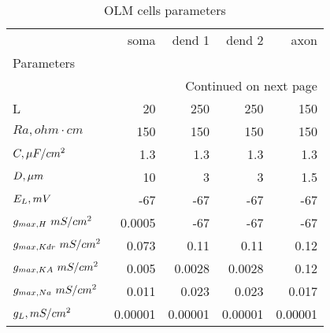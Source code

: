 \begin{longtable}{lrrrr}
\caption{OLM cells parameters}\label{ca1__cell_parameters}\\
\toprule
{} &    soma &  dend 1 &  dend 2 &    axon \\
Parameters      &         &         &         &         \\
\midrule
\endhead
\midrule
\multicolumn{5}{r}{{Continued on next page}} \\
\midrule
\endfoot

\bottomrule
\endlastfoot
L               &      20 &     250 &     250 &     150 \\
$Ra,
 ohm \cdot cm$              &     150 &     150 &     150 &     150 \\
$C, \linebreak \mu F / cm^2$              &     1.3 &     1.3 &     1.3 &     1.3 \\
$D,\linebreak \mu m$            &      10 &       3 &       3 &     1.5 \\
$E_L, \linebreak mV$       &     -67 &     -67 &     -67 &     -67 \\
$g_{max, H  }\linebreak \  mS / cm^2$&  0.0005 &     -67 &     -67 &     -67 \\
$g_{max, Kdr }\linebreak \  mS / cm^2$&   0.073 &    0.11 &    0.11 &    0.12 \\
$g_{max, KA  }\linebreak \  mS / cm^2$&   0.005 &  0.0028 &  0.0028 &    0.12 \\
$g_{max, Na     }\linebreak \  mS / cm^2$&   0.011 &   0.023 &   0.023 &   0.017 \\
$g_L, \linebreak mS / cm^2$    & 0.00001 & 0.00001 & 0.00001 & 0.00001 \\
\end{longtable}

